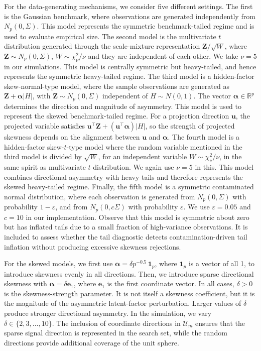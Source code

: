 \documentclass[11pt]{article}
\theoremstyle{plain}
\theoremstyle{definition}
\theoremstyle{remark}
\def\R{\mathbb{R}}
\def\u{\bm{u}}
\newcommand{\boldalpha}{\bm{\alpha}}
\newcommand{\abs}[1]{\left\lvert #1 \right\rvert}
\begin{document}
For the data-generating mechanisms, we consider five different settings.  The first is the Gaussian benchmark, where observations are generated independently from $N_p(0,\Sigma)$. This model represents the symmetric benchmark-tailed regime and is used to evaluate empirical size. The second model is the multivariate $t$ distribution generated through the scale-mixture representation $\bm{Z}/\sqrt{W}$, where $\bm{Z} \sim N_p(0,\Sigma)$, $W\sim \chi^2_{\nu}/\nu$ and they are independent of each other.  We take $\nu=5$ in our simulations. This model is centrally symmetric but heavy-tailed, and hence represents the symmetric heavy-tailed regime. The third model is a hidden-factor skew-normal-type model, where the sample observations are generated as $\bm{Z}+\boldalpha\abs{H}$, with $\bm{Z} \sim N_p(0,\Sigma)$ independent of $H \sim N(0,1)$. The vector $\boldalpha \in \R^p$ determines the direction and magnitude of asymmetry. This model is used to represent the skewed benchmark-tailed regime.  For a projection direction $\u$, the projected variable satisfies $\u^\top \bm{Z} + (\u^\top\boldalpha)\abs{H}$, so the strength of projected skewness depends on the alignment between $\u$ and $\boldalpha$. The fourth model is a hidden-factor skew-$t$-type model where the random variable mentioned in the third model is divided by $\sqrt{W}$, for an independent variable $W\sim \chi^2_{\nu}/\nu$, in the same spirit as multivariate $t$ distribution. We again use $\nu=5$ in this.  This model combines directional asymmetry with heavy tails and therefore represents the skewed heavy-tailed regime. Finally, the fifth model is a symmetric contaminated normal distribution, where each observation is generated from $N_p(0,\Sigma)$ with probability $1-\varepsilon$, and from $N_p(0,c\Sigma)$ with probability $\varepsilon$. We use $\varepsilon=0.05$ and $c=10$ in our implementation. Observe that this model is symmetric about zero but has inflated tails due to a small fraction of high-variance observations.  It is included to assess whether the tail diagnostic detects contamination-driven tail inflation without producing excessive skewness rejections.

For the skewed models, we first use $\boldalpha = \delta p^{-0.5} \, \mathbf{1}_p$, where $\mathbf{1}_p$ is a vector of all 1, to introduce skewness evenly in all directions. Then, we introduce sparse directional skewness with $\boldalpha = \delta \bm{e}_1$, where $\bm{e}_1$ is the first coordinate vector. In all cases, $\delta>0$ is the skewness-strength parameter. It is not itself a skewness coefficient, but it is the magnitude of the asymmetric latent-factor perturbation.  Larger values of $\delta$ produce stronger directional asymmetry.  In the simulation, we vary $\delta \in \{2,3,\ldots,10\}$. The inclusion of coordinate directions in $\mathcal U_m$ ensures that the sparse signal direction is represented in the search set, while the random directions provide additional coverage of the unit sphere.
\end{document}
